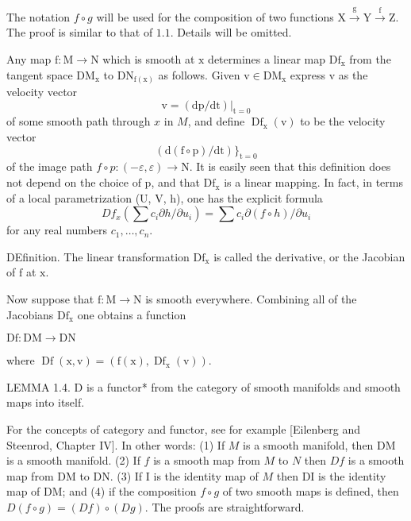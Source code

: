 \documentclass[10pt]{article}
\begin{document}
The notation $f \circ g$ will be used for the composition of two functions $\mathrm{X} \stackrel{\mathrm{g}}{\longrightarrow} \mathrm{Y} \stackrel{\mathrm{f}}{\longrightarrow} \mathrm{Z}$. The proof is similar to that of $1.1$. Details will be omitted.

Any map $\mathrm{f}: \mathrm{M} \rightarrow \mathrm{N}$ which is smooth at $\mathrm{x}$ determines a linear map $\mathrm{Df}_{\mathrm{x}}$ from the tangent space $\mathrm{DM}_{\mathrm{x}}$ to $\mathrm{DN}_{\mathrm{f}(\mathrm{x})}$ as follows. Given $\mathrm{v} \in \mathrm{DM}_{\mathrm{x}}$ express $\mathrm{v}$ as the velocity vector
$$
\mathrm{v}=\left.(\mathrm{dp} / \mathrm{dt})\right|_{\mathrm{t}=0}
$$
of some smooth path through $x$ in $M$, and define $\operatorname{Df}_{\mathrm{x}}(\mathrm{v})$ to be the velocity vector
$$
(\mathrm{d}(\mathrm{f} \circ \mathrm{p}) / \mathrm{dt})\}_{\mathrm{t}=0}
$$
of the image path $f \circ p:(-\varepsilon, \varepsilon) \rightarrow \mathrm{N}$. It is easily seen that this definition does not depend on the choice of $\mathrm{p}$, and that $\mathrm{Df}_{\mathrm{x}}$ is a linear mapping. In fact, in terms of a local parametrization (U, V, h), one has the explicit formula
$$
D f_{x}\left(\sum c_{i} \partial h / \partial u_{i}\right)=\sum c_{i} \partial(f \circ h) / \partial u_{i}
$$
for any real numbers $c_{1}, \ldots, c_{n}$.

DEfinition. The linear transformation $\mathrm{Df}_{\mathrm{x}}$ is called the derivative, or the Jacobian of $\mathrm{f}$ at $\mathrm{x}$.

Now suppose that $\mathrm{f}: \mathrm{M} \rightarrow \mathrm{N}$ is smooth everywhere. Combining all of the Jacobians $\mathrm{Df}_{\mathrm{x}}$ one obtains a function

$\mathrm{Df}: \mathrm{DM} \rightarrow \mathrm{DN}$

where $\operatorname{Df}(\mathrm{x}, \mathrm{v})=\left(\mathrm{f}(\mathrm{x}), \operatorname{Df}_{\mathrm{x}}(\mathrm{v})\right)$.

LEMMA 1.4. $\mathrm{D}$ is a functor* from the category of smooth manifolds and smooth maps into itself.

For the concepts of category and functor, see for example [Eilenberg and Steenrod, Chapter IV]. In other words: (1) If $M$ is a smooth manifold, then DM is a smooth manifold. (2) If $f$ is a smooth map from $M$ to $N$ then $D f$ is a smooth map from DM to DN. (3) If I is the identity map of $M$ then DI is the identity map of DM; and (4) if the composition $f \circ g$ of two smooth maps is defined, then $D(f \circ g)=(D f) \circ(D g)$. The proofs are straightforward.
\end{document}
